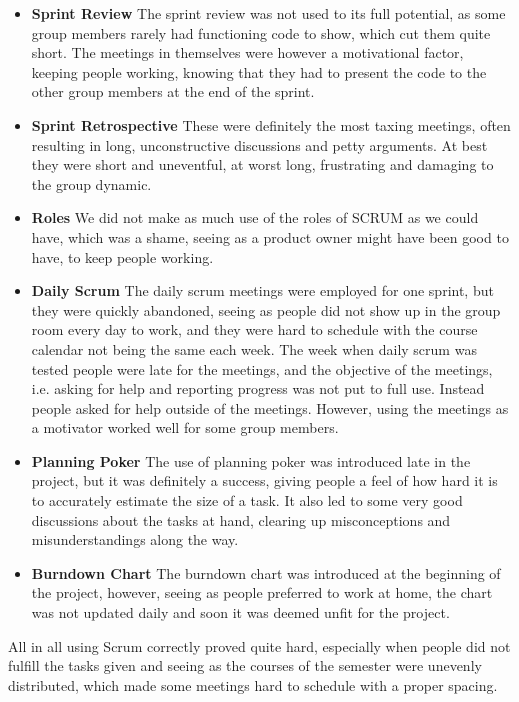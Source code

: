 \begin{itemize}
	\item \textbf{Sprint Review} The sprint review was not used to its full potential, as some group members rarely had
	functioning code to show, which cut them quite short. The meetings in themselves were however a motivational factor, keeping
	people working, knowing that they had to present the code to the other group members at  the end of the sprint.
	
	\item \textbf{Sprint Retrospective} These were definitely the most taxing meetings, often resulting in long, unconstructive
	discussions and petty arguments. At best they were short and uneventful, at worst long, frustrating and damaging to the
	group dynamic.
	
	\item \textbf{Roles} We did not make as much use of the roles of SCRUM as we could have, which was a shame, seeing as a
	product owner might have been good to have, to keep people working.
	
	\item \textbf{Daily Scrum} The daily scrum meetings were employed for one sprint, but they were quickly abandoned, seeing
	as people did not show up in the group room every day to work, and they were hard to schedule with the course calendar not
	being the same each week. The week when daily scrum was tested people were late for the meetings, and the objective of the
	meetings, i.e. asking for help and reporting progress was not put to full use. Instead people asked for help outside of the
	meetings. However, using the meetings as a motivator worked well for some group members.
	
	\item \textbf{Planning Poker} The use of planning poker was introduced late in the project, but it was definitely a success,
	giving people a feel of how hard it is to accurately estimate the size of a task. It also led to some very good discussions
	about the tasks at hand, clearing up misconceptions and misunderstandings along the way. 
	
	\item \textbf{Burndown Chart} The burndown chart was introduced at the beginning of the project, however, seeing as people
	preferred to work at home, the chart was not updated daily and soon it was deemed unfit for the project.
\end{itemize}

All in all using Scrum correctly proved quite hard, especially when people did not fulfill the tasks given and seeing as the courses of the semester were unevenly distributed, which made some meetings hard to schedule with a proper spacing. 